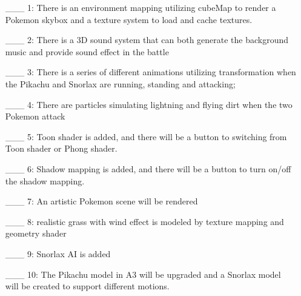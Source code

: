 \documentclass {article}
\begin{document}
\begin{enumerate}
     \item[\_\_\_ 1:]  There is an environment mapping utilizing cubeMap to render a Pokemon skybox and a texture system to load and cache textures.

     \item[\_\_\_ 2:]  There is a 3D sound system that can both generate the background music and provide sound effect in the battle

     \item[\_\_\_ 3:]  There is a series of different animations utilizing transformation when the Pikachu and Snorlax are running, standing and attacking;  

     \item[\_\_\_ 4:]  There are particles simulating lightning and flying dirt when the two Pokemon attack

     \item[\_\_\_ 5:]  Toon shader is added, and there will be a button to switching from Toon shader or Phong shader.

     \item[\_\_\_ 6:]  Shadow mapping is added, and there will be a button to turn on/off the shadow mapping.

     \item[\_\_\_ 7:]  An artistic Pokemon scene will be rendered

     \item[\_\_\_ 8:]  realistic grass with wind effect is modeled by texture mapping and geometry shader

     \item[\_\_\_ 9:]  Snorlax AI is added

     \item[\_\_\_ 10:]  The Pikachu model in A3 will be upgraded and a Snorlax model will be created to support different motions.
\end{enumerate}

\end{document}
